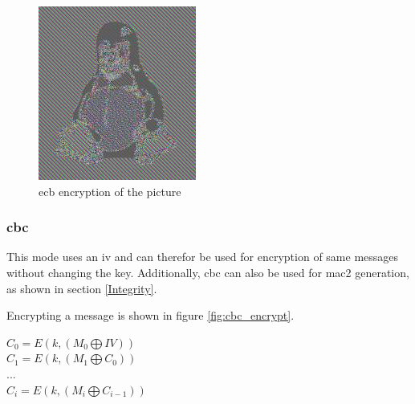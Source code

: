 \begin{minipage}{\linewidth}
\begin{minipage}{0.4\linewidth}
\begin{figure}[H]
              \includegraphics[width=\linewidth]{figures/TuxECB.png}
              \caption{\gls{ecb} encryption of the picture}
              \label{fig:tuxecb}
          \end{figure}
      \end{minipage}
  \end{minipage}

\subsubsection{\gls{cbc}}

This mode uses an \gls{iv} and can therefor be used for encryption of same messages without changing the key. Additionally, \gls{cbc} can also be used
for \gls{mac2} generation, as shown in section \ref{Integrity}.

Encrypting a message is shown in figure \ref{fig:cbc_encrypt}.

\begin{center}
$ C_0 = E(k, (M_0 \bigoplus IV ) )  $
\\
$ C_1 = E(k, (M_1  \bigoplus C_0) ) $
\\
$...$
\\
$ C_i = E(k, (M_i \bigoplus C_{i-1} ) )  $
\end{center}

